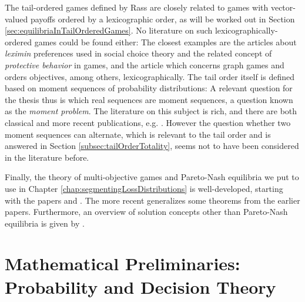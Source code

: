 \documentclass[a4paper,DIV=11]{scrreprt}
\theoremstyle{definition}
\begin{document}
    The tail-ordered games defined by Rass are closely related to games with vector-valued payoffs ordered by a lexicographic order, as will be worked out in Section \ref{sec:equilibriaInTailOrderedGames}. No literature on such lexicographically-ordered games could be found either:
    The closest examples are the articles \cites{bib:salvadorLeximin, bib:quantPropernessProtectiveness} about \emph{leximin} preferences used in social choice theory and the related concept of \emph{protective behavior} in games, and the article \cite{bib:bouyerConcurrentGamesWithOrderedObjectives} which concerns graph games and orders objectives, among others, lexicographically.
    The tail order itself is defined based on moment sequences of probability distributions: A relevant question for the thesis thus is which real sequences are moment sequences, a question known as the \emph{moment problem}. The literature on this subject is rich, and there are both classical and more recent publications, e.g. \cite{bib:hausdorffMomentprobleme,bib:akhiezerClassicalMomentProblem,bib:chiharaIndeterminateHamburgerMomentProblems,bib:schmuedgenTheMomentProblem}. 
    However the question whether two moment sequences can alternate, which is relevant to the tail order and is answered in Section \ref{subsec:tailOrderTotality}, seems not to have been considered in the literature before.
    
    \enlargethispage*{\baselineskip}
    Finally, the theory of multi-objective games and Pareto-Nash equilibria we put to use in {Chapter \ref{chap:segmentingLossDistributions}} is well-developed, starting with the papers \cite{bib:blackwellVectorPayoffs} and \cite{bib:shapleyMultiobjectiveEquilibriumPoints}. The more recent \cite{bib:paretoNashEquilibria} generalizes some theorems from the earlier papers. Furthermore, an overview of solution concepts other than Pareto-Nash equilibria is given by \cite{bib:ghoseSolutionConceptsMultiobjective}.
    
    
    \chapter{Mathematical Preliminaries: Probability and Decision Theory}
    \label{chap:mathematicalPreliminaries}
    
\end{document}
